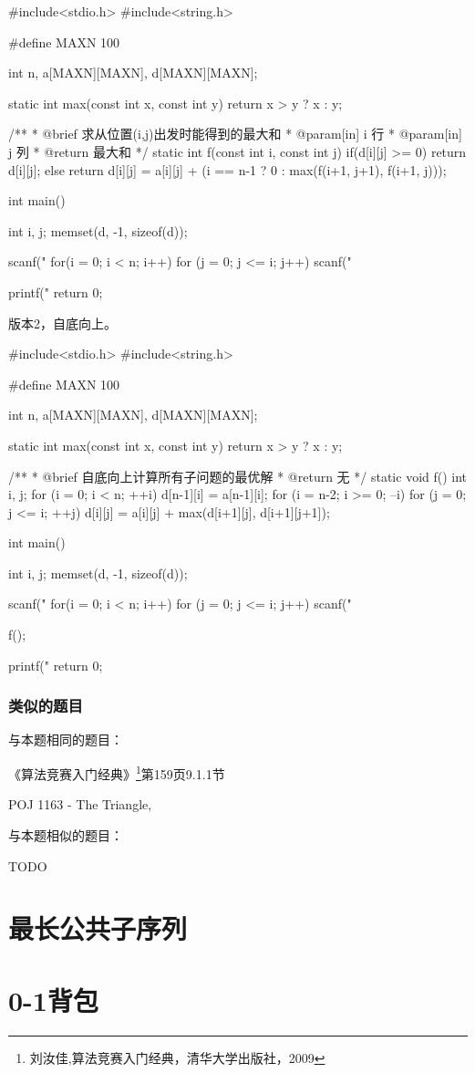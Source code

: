\begin{Codex}[label=numbers_triangle1.c]
#include<stdio.h>
#include<string.h>

#define MAXN 100

int n, a[MAXN][MAXN], d[MAXN][MAXN];

static int max(const int x, const int y) {
    return x > y ? x : y;
}

/**
 * @brief 求从位置(i,j)出发时能得到的最大和
 * @param[in] i 行
 * @param[in] j 列
 * @return 最大和
 */
static int f(const int i, const int j) {
    if(d[i][j] >= 0) {
        return d[i][j];
    } else {
        return d[i][j] = a[i][j] + (i == n-1 ? 0 : max(f(i+1, j+1), f(i+1, j)));
    }
}

int main() {
    int i, j;
    memset(d, -1, sizeof(d));

    scanf("%
    for(i = 0; i < n; i++)
      for (j = 0; j <= i; j++) scanf("%
    
    printf("%
    return 0;
}

\end{Codex}

版本2，自底向上。

\begin{Codex}[label=numbers_triangle2.c]
#include<stdio.h>
#include<string.h>

#define MAXN 100

int n, a[MAXN][MAXN], d[MAXN][MAXN];

static int max(const int x, const int y) {
    return x > y ? x : y;
}

/**
 * @brief 自底向上计算所有子问题的最优解
 * @return 无
 */
static void f() {
    int i, j;
    for (i = 0; i < n; ++i) {
        d[n-1][i] = a[n-1][i];
    }
    for (i = n-2; i >= 0; --i)
      for (j = 0; j <= i; ++j)
        d[i][j] = a[i][j] + max(d[i+1][j], d[i+1][j+1]);
}

int main() {
    int i, j;
    memset(d, -1, sizeof(d));

    scanf("%
    for(i = 0; i < n; i++)
      for (j = 0; j <= i; j++) 
          scanf("%

    f();
    
    printf("%
    return 0;
}
\end{Codex}

\subsubsection{类似的题目}
与本题相同的题目：
\begindot
\item 《算法竞赛入门经典》\footnote{刘汝佳,算法竞赛入门经典，清华大学出版社，2009}第159页9.1.1节
\item  POJ 1163 - The Triangle, 
\myenddot

与本题相似的题目：
\begindot
\item  TODO
\myenddot

\section{最长公共子序列} %

\section{0-1背包} %